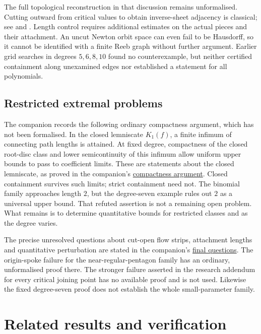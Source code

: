 \documentclass[11pt]{article}
\newcommand{\recordlink}[3]{\href{#1\##2}{#3}}
\begin{document}
The full topological reconstruction in that discussion remains unformalised.
Cutting outward from critical values to obtain inverse-sheet adjacency
is classical; see \cite[\S1]{dubinin2006critical} and
\cite[\S2]{dubinin2006capacity}. Length control requires additional
estimates on the actual pieces and their attachment. An uncut Newton orbit space can even fail to be Hausdorff, so it cannot
be identified with a finite Reeb graph without further argument. Earlier
grid searches in degrees $5,6,8,10$ found no counterexample, but neither
certified containment along unexamined edges nor established a statement
for all polynomials.

\subsection{Restricted extremal problems}
The companion records the following ordinary compactness argument, which
has not been formalised. In the closed lemniscate $K_1(f)$, a finite
infimum of connecting path lengths is attained. At fixed degree, compactness of the closed root-disc
class and lower semicontinuity of this infimum allow uniform upper bounds
to pass to coefficient limits. These are statements about the closed
lemniscate, as proved in the companion's
\recordlink{erdos1041-lemniscate-reasoning-surface.pdf}{closed-class-limits}
{compactness argument}. Closed containment survives such limits;
strict containment need not. The binomial family approaches length $2$, but the degree-seven example
rules out $2$ as a universal upper bound. That refuted assertion is not
a remaining open problem. What remains is to determine quantitative
bounds for restricted classes and as the degree varies.

The precise unresolved questions about cut-open flow strips,
attachment lengths and quantitative perturbation are stated in the
companion's
\recordlink{erdos1041-lemniscate-reasoning-surface.pdf}{remaining-questions}
{final questions}. The origin-spoke failure for the near-regular-pentagon
family has an ordinary, unformalised proof there. The stronger failure asserted in the research
addendum \cite{revision2026} for every critical joining point has no
available proof and is not used. Likewise the fixed degree-seven proof
does not establish the whole small-parameter family.

\section{Related results and verification}\label{sec:1041-sources}
\end{document}
